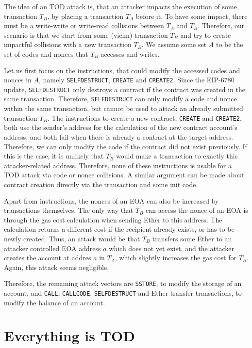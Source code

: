 \documentclass[draft,final]{vutinfth} %
\begin{document}
The idea of an TOD attack is, that an attacker impacts the execution of some transaction $T_B$, by placing a transaction $T_A$ before it. To have some impact, there must be a write-write or write-read collisions between $T_A$ and $T_B$. Therefore, our scenario is that we start from some (vicim) transaction $T_B$ and try to create impactful collisions with a new transaction $T_B$. We assume some set $A$ to be the set of codes and nonces that $T_B$ accesses and writes.

Let us first focus on the instructions, that could modify the accessed codes and nonces in $A$, namely \verb|SELFDESTRUCT|, \verb|CREATE| and \verb|CREATE2|. Since the EIP-6780 update\cite{ballet_eip-6780_2023}, \verb|SELFDESTRUCT| only destroys a contract if the contract was created in the same transaction. Therefore, \verb|SELFDESTRUCT| can only modify a code and nonce within the same transaction, but cannot be used to attack an already submitted transaction $T_B$. The instructions to create a new contract, \verb|CREATE| and \verb|CREATE2|, both use the sender's address for the calculation of the new contract account's address, and both fail when there is already a contract at the target address. \cite[p.11]{wood_ethereum_2024} Therefore, we can only modify the code if the contract did not exist previously. If this is the case, it is unlikely that $T_B$ would make a transaction to exactly this attacker-related address. Therefore, none of these instructions is usable for a TOD attack via code or nonce collisions. A similar argument can be made about contract creation directly via the transaction and some init code.

Apart from instructions, the nonces of an EOA can also be increased by transactions themselves. The only way that $T_B$ can access the nonce of an EOA is through the gas cost calculation when sending Ether to this address. The calculation returns a different cost if the recipient already exists, or has to be newly created. Thus, an attack would be that $T_B$ transfers some Ether to an attacker controlled EOA address $a$ which does not yet exist, and the attacker creates the account at addres $a$ in $T_A$, which slightly increases the gas cost for $T_B$. Again, this attack seems negligible.

Therefore, the remaining attack vectors are \verb|SSTORE|, to modify the storage of an account, and \verb|CALL|, \verb|CALLCODE|, \verb|SELFDESTRUCT| and Ether transfer transactions, to modify the balance of an account.

\section{Everything is TOD}
\end{document}
